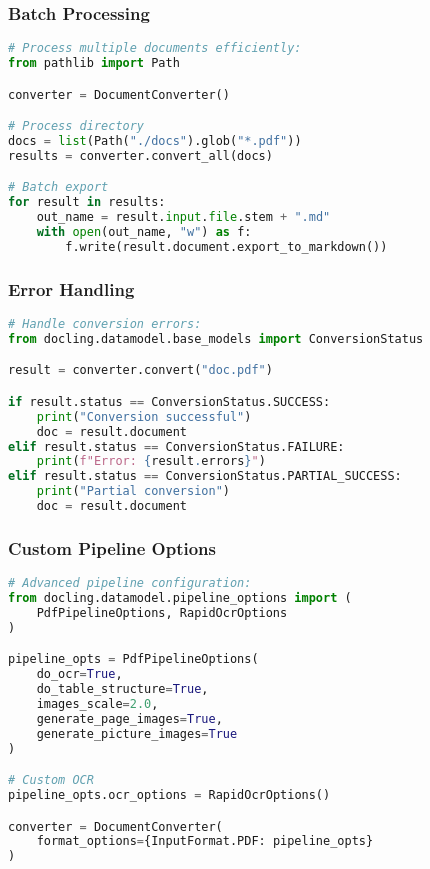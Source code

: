 \begin{frame}[fragile]\frametitle{Batch Processing}
\begin{lstlisting}[language=python,basicstyle=\tiny]
# Process multiple documents efficiently:
from pathlib import Path

converter = DocumentConverter()

# Process directory
docs = list(Path("./docs").glob("*.pdf"))
results = converter.convert_all(docs)

# Batch export
for result in results:
    out_name = result.input.file.stem + ".md"
    with open(out_name, "w") as f:
        f.write(result.document.export_to_markdown())
\end{lstlisting}
\end{frame}

\begin{frame}[fragile]\frametitle{Error Handling}
\begin{lstlisting}[language=python,basicstyle=\tiny]
# Handle conversion errors:
from docling.datamodel.base_models import ConversionStatus

result = converter.convert("doc.pdf")

if result.status == ConversionStatus.SUCCESS:
    print("Conversion successful")
    doc = result.document
elif result.status == ConversionStatus.FAILURE:
    print(f"Error: {result.errors}")
elif result.status == ConversionStatus.PARTIAL_SUCCESS:
    print("Partial conversion")
    doc = result.document
\end{lstlisting}
\end{frame}

\begin{frame}[fragile]\frametitle{Custom Pipeline Options}
\begin{lstlisting}[language=python,basicstyle=\tiny]
# Advanced pipeline configuration:
from docling.datamodel.pipeline_options import (
    PdfPipelineOptions, RapidOcrOptions
)

pipeline_opts = PdfPipelineOptions(
    do_ocr=True,
    do_table_structure=True,
    images_scale=2.0,
    generate_page_images=True,
    generate_picture_images=True
)

# Custom OCR
pipeline_opts.ocr_options = RapidOcrOptions()

converter = DocumentConverter(
    format_options={InputFormat.PDF: pipeline_opts}
)
\end{lstlisting}
\end{frame}

